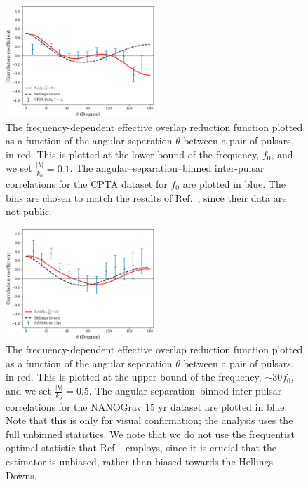 \documentclass[prd,aps,psfig,nofootinbib,nobibnotes,superscriptaddress,preprintnumbers,times]{revtex4-2}\setlength{\topmargin}{-14mm}
\begin{document}
\begin{figure}[h]
    \centering
    \includegraphics[width=0.5\textwidth]{fig0.pdf}
    \caption{The frequency-dependent effective overlap reduction function plotted as a function of the angular separation $\theta$ between a pair of pulsars, in red. This is plotted at the lower bound of the frequency, $f_0$, and we set $\frac{|k|}{k_0} = 0.1$. The angular–separation–binned inter-pulsar correlations for the CPTA dataset for $f_0$ are plotted in blue. The bins are chosen to match the results of Ref.\ \cite{Xu:2023wog}, since their data are not public.}
    \label{fig:orf}
\end{figure}

\begin{figure}[h]
    \centering
    \includegraphics[width=0.5\textwidth]{fig1.pdf}
    \caption{The frequency-dependent effective overlap reduction function plotted as a function of the angular separation $\theta$ between a pair of pulsars, in red. This is plotted at the upper bound of the frequency, $\sim 30f_0$, and we set $\frac{|k|}{k_0} = 0.5$. The angular-separation–binned inter-pulsar correlations for the NANOGrav 15 yr dataset are plotted in blue. Note that this is only for visual confirmation; the analysis uses the full unbinned statistics. We note that we do not use the frequentist optimal statistic that Ref.\ \cite{Agazie:2023} employs, since it is crucial that the estimator is unbiased, rather than biased towards the Hellings-Downs.} 
    \label{fig:orf}
\end{figure}
\end{document}
